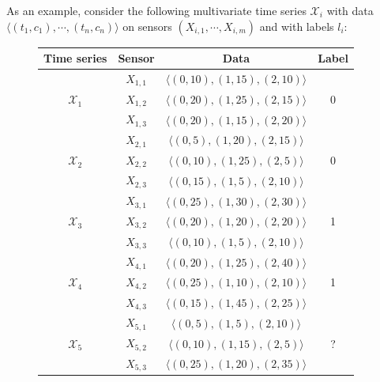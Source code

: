 \begin{example}
    As an example, consider the following multivariate time series $\mathcal{X}_i$ with data \newline $\langle (t_1, c_1), \cdots, (t_n, c_n)\rangle$ on sensors $(X_{i,1}, \cdots, X_{i,m})$ and with labels $l_i$:
    
    \begin{figure}[H]
        \centering
        \begin{tabular}{|c|c|c|c|}
            \hline
             Time series & Sensor & Data & Label \\ \hline
             \multirow{3}{*}{$\mathcal{X}_1$} & $X_{1,1}$ & $\langle (0, 10), (1, 15), (2, 10)\rangle$ & \multirow{3}{*}{0} \\
                                              & $X_{1,2}$ & $\langle (0, 20), (1, 25), (2, 15)\rangle$ & \\
                                              & $X_{1,3}$ & $\langle (0, 20), (1, 15), (2, 20)\rangle$ & \\ \hline
             \multirow{3}{*}{$\mathcal{X}_2$} & $X_{2,1}$ & $\langle (0, 5), (1, 20), (2, 15)\rangle$ & \multirow{3}{*}{0} \\
                                              & $X_{2,2}$ & $\langle (0, 10), (1, 25), (2, 5)\rangle$ & \\
                                              & $X_{2,3}$ & $\langle (0, 15), (1, 5), (2, 10)\rangle$ & \\ \hline
             \multirow{3}{*}{$\mathcal{X}_3$} & $X_{3,1}$ & $\langle (0, 25), (1, 30), (2, 30)\rangle$ & \multirow{3}{*}{1} \\
                                              & $X_{3,2}$ & $\langle (0, 20), (1, 20), (2, 20)\rangle$ & \\
                                              & $X_{3,3}$ & $\langle (0, 10), (1, 5), (2, 10)\rangle$ & \\ \hline
             \multirow{3}{*}{$\mathcal{X}_4$} & $X_{4,1}$ & $\langle (0, 20), (1, 25), (2, 40)\rangle$ & \multirow{3}{*}{1} \\
                                              & $X_{4,2}$ & $\langle (0, 25), (1, 10), (2, 10)\rangle$ & \\
                                              & $X_{4,3}$ & $\langle (0, 15), (1, 45), (2, 25)\rangle$ & \\ \hline
             \multirow{3}{*}{$\mathcal{X}_5$} & $X_{5,1}$ & $\langle (0, 5), (1, 5), (2, 10)\rangle$ & \multirow{3}{*}{?} \\
                                              & $X_{5,2}$ & $\langle (0, 10), (1, 15), (2, 5)\rangle$ & \\
                                              & $X_{5,3}$ & $\langle (0, 25), (1, 20), (2, 35)\rangle$ & \\ \hline
        \end{tabular}
    \end{figure}
    

\end{example}
